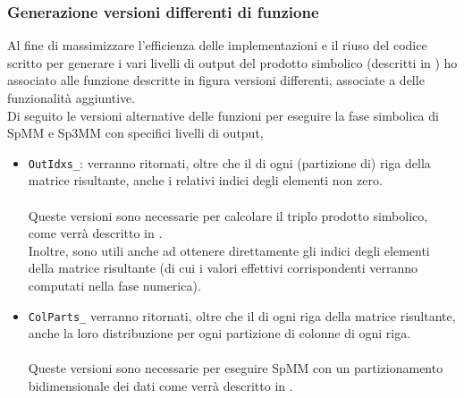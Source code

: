 \subsubsection{Generazione versioni differenti di funzione}
%
Al fine di massimizzare l'efficienza delle implementazioni e il riuso del codice scritto 
per generare i vari livelli di output del prodotto simbolico (descritti in )
ho associato alle funzione descritte in figura  
versioni differenti, associate a delle funzionalità aggiuntive.\\
\label{chSpMMSymb:outputDetailLevel_coreFuncsVersions}
Di seguito le versioni alternative delle funzioni per eseguire la fase simbolica di SpMM e Sp3MM con specifici livelli di output,
\begin{itemize}
	\item	\verb|OutIdxs_|:
	verranno ritornati, oltre che il \nnnz di ogni (partizione di) riga della matrice risultante,
	anche i relativi indici degli elementi non zero. %
	\\ \\
	Queste versioni sono necessarie per calcolare il triplo prodotto simbolico,
	come verrà descritto in .\\
	Inoltre, sono utili anche ad ottenere direttamente gli indici 
	degli elementi \nnz della matrice risultante (di cui i valori effettivi corrispondenti verranno computati nella fase numerica).\\

	\item	\verb|ColParts_|
	verranno ritornati, oltre che il \nnnz di ogni riga della matrice risultante,
	anche la loro distribuzione per ogni partizione di colonne di ogni riga. %
	\\ \\ 
	Queste versioni sono necessarie per eseguire SpMM con un partizionamento bidimensionale dei dati
	come verrà descritto in .\\

\end{itemize}

